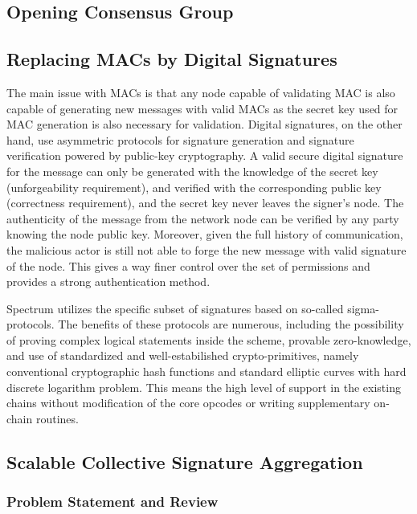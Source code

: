 \subsection{Opening Consensus Group}\label{subsec:opening-consensus-group-and-leaders}


\subsection{Replacing MACs by Digital Signatures}\label{subsec:replacing-macs-by-digital-signatures}

The main issue with MACs is that any node capable of validating MAC is also capable of generating new messages with
valid MACs as the secret key used for MAC generation is also necessary for validation. Digital signatures, on the other
hand, use asymmetric protocols for signature generation and signature verification powered by public-key cryptography. A
valid secure digital signature for the message can only be generated with the knowledge of the secret key
(unforgeability requirement), and verified with the corresponding public key (correctness requirement), and the secret
key never leaves the signer's node. The authenticity of the message from the network node can be verified by any party
knowing the node public key. Moreover, given the full history of communication, the malicious actor is still not able to
forge the new message with valid signature of the node. This gives a way finer control over the set of permissions and
provides a strong authentication method.

Spectrum utilizes the specific subset of signatures based on so-called sigma-protocols. The benefits of these protocols
are numerous, including the possibility of proving complex logical statements inside the scheme, provable
zero-knowledge, and use of standardized and well-estabilished crypto-primitives, namely conventional cryptographic hash
functions and standard elliptic curves with hard discrete logarithm problem. This means the high level of support in the
existing chains without modification of the core opcodes or writing supplementary on-chain routines.

\subsection{Scalable Collective Signature Aggregation}\label{subsec:scalable-collective-signature-aggregation}

\subsubsection{Problem Statement and Review}

